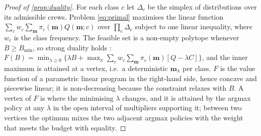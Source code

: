 \documentclass[11pt,a4paper]{article}
\theoremstyle{definition}
\theoremstyle{remark}
\theoremstyle{definition}
\newcommand{\crew}{\mathbf{m}}
\begin{document}
\begin{proof}[Proof of \cref{prop:duality}]
For each class $c$ let $\Delta_c$ be the simplex of distributions over its admissible crews. Problem \eqref{eq:primal} maximises the linear function $\sum_c w_c\sum_\crew\pi_c(\crew)Q(\crew;c)$ over $\prod_c\Delta_c$ subject to one linear inequality, where $w_c$ is the class frequency. The feasible set is a non-empty polytope whenever $B\ge B_{\min}$, so strong duality holds \cite{boyd2004}: $F(B)=\min_{\lambda\ge0}\{\lambda B+\max_{\pi}\sum_c w_c\sum_\crew\pi_c(\crew)[Q-\lambda C]\}$, and the inner maximum is attained at a vertex, i.e.\ a deterministic $\crew_\lambda$ per class. $F$ is the value function of a parametric linear program in the right-hand side, hence concave and piecewise linear; it is non-decreasing because the constraint relaxes with $B$. A vertex of $F$ is where the minimising $\lambda$ changes, and it is attained by the argmax policy at any $\lambda$ in the open interval of multipliers supporting it; between two vertices the optimum mixes the two adjacent argmax policies with the weight that meets the budget with equality.
\end{proof}
\end{document}
